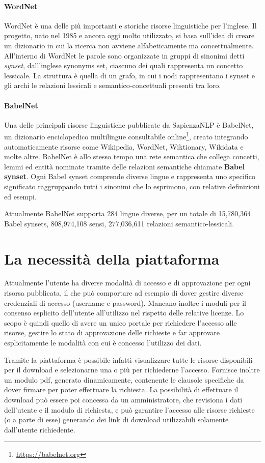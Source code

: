 \paragraph{WordNet \cite{Miller1990}}
WordNet è una delle più importanti e storiche risorse linguistiche per l'inglese.
Il progetto, nato nel 1985 e ancora oggi molto utilizzato, si basa sull'idea
di creare un dizionario in cui la ricerca non avviene alfabeticamente ma concettualmente.
All'interno di WordNet le parole sono organizzate in gruppi di sinonimi detti
\textit{synset}, dall'inglese synonyms set, ciascuno dei quali rappresenta un
concetto lessicale.
La struttura è quella di un grafo, in cui i nodi rappresentano i synset e gli archi
le relazioni lessicali e semantico-concettuali presenti tra loro.

\paragraph{BabelNet \cite{NavigliPonzetto:12aij}}
Una delle principali risorse linguistiche pubblicate da SapienzaNLP è BabelNet,
un dizionario enciclopedico multilingue consultabile online\footnote{\url{https://babelnet.org}},
creato integrando automaticamente risorse come Wikipedia, WordNet, Wiktionary,
Wikidata e molte altre.
BabelNet è allo stesso tempo una rete semantica che collega concetti, lemmi
ed entità nominate tramite delle relazioni semantiche chiamate \textbf{Babel synset}.
Ogni Babel synset comprende diverse lingue e rappresenta uno specifico significato
raggruppando tutti i sinonimi che lo esprimono, con relative definizioni ed esempi.

Attualmente BabelNet supporta 284 lingue diverse, per un totale di 15,780,364
Babel synsets, 808,974,108 sensi, 277,036,611 relazioni semantico-lessicali.



\section{La necessità della piattaforma}
Attualmente l'utente ha diverse modalità di accesso e di approvazione per ogni
risorsa pubblicata, il che può comportare ad esempio di dover gestire diverse
credenziali di accesso (username e password). Mancano inoltre i moduli per il
consenso esplicito dell'utente all'utilizzo nel rispetto delle relative licenze.
Lo scopo è quindi quello di avere un unico portale per richiedere l'accesso alle
risorse, gestire lo stato di approvazione delle richieste e far approvare
esplicitamente le modalità con cui è concesso l'utilizzo dei dati.

Tramite la piattaforma è possibile infatti visualizzare tutte le risorse
disponibili per il download e selezionarne una o più per richiederne l'accesso.
Fornisce inoltre un modulo pdf, generato dinamicamente, contenente le clausole
specifiche da dover firmare per poter effettuare la richiesta. La possibilità di
effettuare il download può essere poi concessa da un amministratore, che revisiona
i dati dell'utente e il modulo di richiesta, e può garantire l'accesso alle risorse
richieste (o a parte di esse) generando dei link di download utilizzabili
solamente dall'utente richiedente.